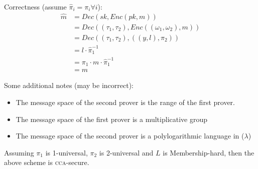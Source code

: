 Correctness (assume $\hat{\pi}_i = \pi_i \forall i$):
\begin{align*}
    \hat{m} &= Dec(sk, Enc(pk, m)) \\
    &= Dec((\tau_1, \tau_2), Enc((\omega_1, \omega_2), m)) \\
    &= Dec((\tau_1, \tau_2), ((y, l), \pi_2)) \\
    &= l \cdot \hat{\pi}_1^{-1} \\
    &= \pi_1 \cdot m \cdot \hat{\pi}_1^{-1} \\
    &= m
\end{align*}

Some additional notes (may be incorrect):
\begin{itemize}
    \item The message space of the second prover is the range of the first prover.
    \item The message space of the first prover is a multiplicative group
    \item The message space of the second prover is a polylogarithmic language in ($\lambda$)
\end{itemize}





\begin{theorem}
    Assuming $\pi_1$ is 1-universal, $\pi_2$ is 2-universal and $L$ is Membership-hard, then the above scheme is \textsc{cca}-secure.
\end{theorem}

